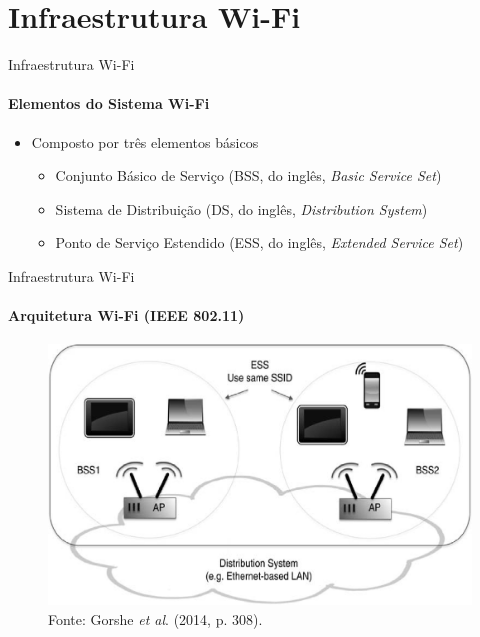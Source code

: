 \documentclass[aspectratio=169,12pt]{beamer}
\begin{document}
\section{Infraestrutura Wi-Fi}
\begin{frame}{Infraestrutura Wi-Fi}
	\framesubtitle{Elementos do Sistema Wi-Fi}
	\begin{itemize}
		\item Composto por três elementos básicos
		\begin{itemize}
			\item Conjunto Básico de Serviço (BSS, do inglês, \textit{Basic Service Set})

			\item Sistema de Distribuição (DS, do inglês, \textit{Distribution System})

			\item Ponto de Serviço Estendido (ESS, do inglês, \textit{Extended Service Set})
		\end{itemize}
	\end{itemize}
\end{frame}
\begin{frame}{Infraestrutura Wi-Fi}
	\framesubtitle{Arquitetura Wi-Fi (IEEE 802.11)}
	\begin{figure}[H]
		\centering
		\includegraphics[scale=.27]{fig_tcc/arquiteturas_802-11_01.pdf}
		\caption*{{\footnotesize Fonte: Gorshe \textit{et al}. (2014, p. 308).}}
	\end{figure}
\end{frame}
\end{document}
